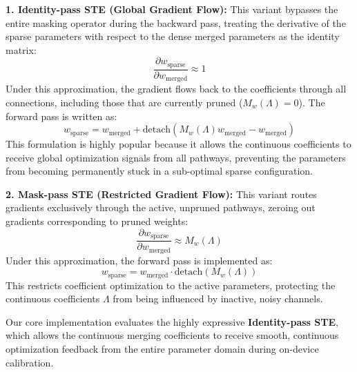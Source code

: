 \textbf{1. Identity-pass STE (Global Gradient Flow):}
This variant bypasses the entire masking operator during the backward pass, treating the derivative of the sparse parameters with respect to the dense merged parameters as the identity matrix:
\begin{equation}
    \frac{\partial w_{\text{sparse}}}{\partial w_{\text{merged}}} \approx 1
\end{equation}
Under this approximation, the gradient flows back to the coefficients through all connections, including those that are currently pruned ($M_w(\Lambda)=0$). The forward pass is written as:
\begin{equation}
    w_{\text{sparse}} = w_{\text{merged}} + \text{detach}\left(M_w(\Lambda) w_{\text{merged}} - w_{\text{merged}}\right)
\end{equation}
This formulation is highly popular because it allows the continuous coefficients to receive global optimization signals from all pathways, preventing the parameters from becoming permanently stuck in a sub-optimal sparse configuration.

\textbf{2. Mask-pass STE (Restricted Gradient Flow):}
This variant routes gradients exclusively through the active, unpruned pathways, zeroing out gradients corresponding to pruned weights:
\begin{equation}
    \frac{\partial w_{\text{sparse}}}{\partial w_{\text{merged}}} \approx M_w(\Lambda)
\end{equation}
Under this approximation, the forward pass is implemented as:
\begin{equation}
    w_{\text{sparse}} = w_{\text{merged}} \cdot \text{detach}\left(M_w(\Lambda)\right)
\end{equation}
This restricts coefficient optimization to the active parameters, protecting the continuous coefficients $\Lambda$ from being influenced by inactive, noisy channels. 

Our core implementation evaluates the highly expressive \textbf{Identity-pass STE}, which allows the continuous merging coefficients to receive smooth, continuous optimization feedback from the entire parameter domain during on-device calibration.

